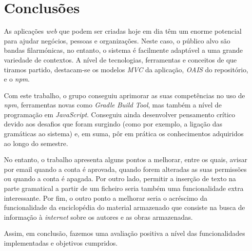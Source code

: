 \section{Conclusões}\label{c:conclusoes}
\qquad As aplicações \textit{web} que podem ser criadas hoje em dia têm um enorme potencial para ajudar negócios, pessoas e organizações. Neste caso, o público alvo são bandas filarmónicas, no entanto, o sistema é facilmente adaptável a uma grande variedade de contextos. A nível de tecnologias, ferramentas e conceitos de que tiramos partido, destacam-se os modelos \textit{MVC} da aplicação, \textit{OAIS} do repositório, e o \textit{npm}.

Com este trabalho, o grupo conseguiu aprimorar as suas competências no uso de \textit{npm}, ferramentas novas como \textit{Gradle Build Tool}, mas também a nível de programação em \textit{JavaScript}. Conseguiu ainda desenvolver pensamento crítico devido aos desafios que foram surgindo (como por exemplo, a ligação das gramáticas ao sistema) e, em suma, pôr em prática os conhecimentos adquiridos ao longo do semestre.

No entanto, o trabalho apresenta alguns pontos a melhorar, entre os quais, avisar por email quando a conta é aprovada, quando forem alteradas as suas permissões ou quando a conta é apagada. Por outro lado, permitir a inserção de texto na parte gramatical a partir de um ficheiro seria também uma funcionalidade extra interessante.
Por fim, o outro ponto a melhorar seria o acréscimo da funcionalidade da enciclopédia do material armazenado que consiste na busca de informação à \textit{internet} sobre os autores e as obras armazenadas.

Assim, em conclusão, fazemos uma avaliação positiva a nível das funcionalidades implementadas e objetivos cumpridos.
